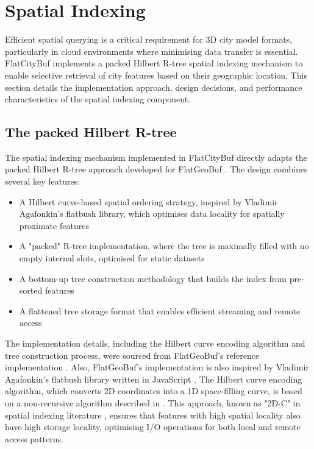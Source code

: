 
\section{Spatial Indexing}
\label{methodology:spatial_index}

Efficient spatial querying is a critical requirement for 3D city model formats, particularly in cloud environments where minimising data transfer is essential. FlatCityBuf implements a packed Hilbert R-tree spatial indexing mechanism \citep{Roussopoulos_Leifker_1985} to enable selective retrieval of city features based on their geographic location. This section details the implementation approach, design decisions, and performance characteristics of the spatial indexing component.

\subsection{The packed Hilbert R-tree}
\label{methodology:spatial_index:packed_hilbert_rtree}

The spatial indexing mechanism implemented in FlatCityBuf directly adapts the packed Hilbert R-tree approach developed for FlatGeoBuf \citep{horance_2022_detail}. The design combines several key features:

\begin{itemize}
  \item A Hilbert curve-based spatial ordering strategy, inspired by Vladimir Agafonkin's flatbush library, which optimises data locality for spatially proximate features
  \item A "packed" R-tree implementation, where the tree is maximally filled with no empty internal slots, optimised for static datasets
  \item A bottom-up tree construction methodology that builds the index from pre-sorted features
  \item A flattened tree storage format that enables efficient streaming and remote access
\end{itemize}

The implementation details, including the Hilbert curve encoding algorithm and tree construction process, were sourced from FlatGeoBuf's reference implementation \citep{flatgeobuf_github}. Also, FlatGeoBuf's implementation is also inspired by Vladimir Agafonkin's flatbush library written in JavaScript \citep{vladimir_2018}. The Hilbert curve encoding algorithm, which converts 2D coordinates into a 1D space-filling curve, is based on a non-recursive algorithm described in \citet{hacker_delight_2012}. This approach, known as "2D-C" in spatial indexing literature \citep{hacker_delight_2012}, ensures that features with high spatial locality also have high storage locality, optimising I/O operations for both local and remote access patterns.

